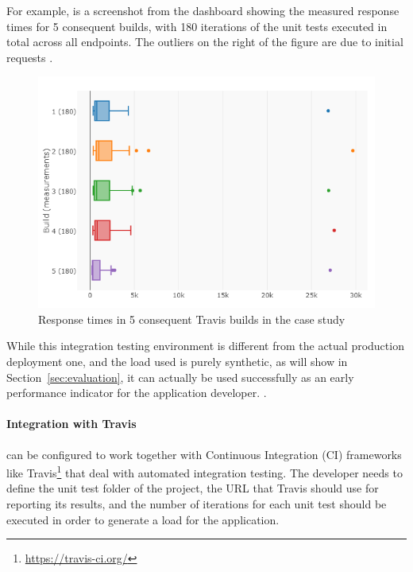 \documentclass{sig-alternate-05-2015}
\begin{document}
  For example,  is a screenshot from the dashboard showing the measured response times for 5 consequent builds, with 180 iterations of the unit tests executed in total across all endpoints. The outliers on the right of the figure are due to initial requests .  


    \begin{figure}[h!]
        \centering
        \includegraphics[width=\columnwidth]{travis_builds}
        \caption{Response times in 5 consequent Travis builds in the \zee case study}
        \label{fig:builds}
      \end{figure}

  
  While this integration testing environment is different from the actual production deployment one, and the load used is purely synthetic, as will show in Section~\ref{sec:evaluation}, it can actually be used successfully as an early performance indicator for the application developer. .  


  \paragraph{Integration with Travis}
  

   can be configured to work together with Continuous Integration (CI) frameworks like Travis\footnote{\url{https://travis-ci.org/}} that deal with automated integration testing.
  The developer needs to define the unit test folder of the project, the URL that Travis should use for reporting its results, and the number of iterations for each unit test should be executed in order to generate a load for the application. 
  
\end{document}
